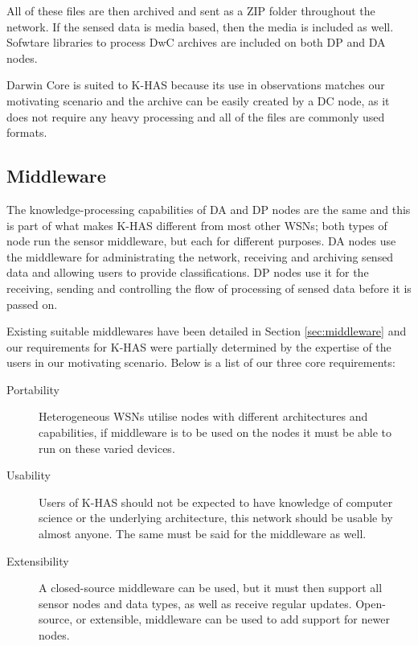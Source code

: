 % 


All of these files are then archived and sent as a ZIP folder throughout the network. If the sensed data is media based, then the media is included as well. Sofwtare libraries to process DwC archives are included on both DP and DA nodes.

Darwin Core is suited to K-HAS because its use in \DIFdelbegin {}\DIFdelend \DIFaddbegin {}\DIFaddend observations matches our motivating scenario and the archive can be easily created by a DC node, as it does not require any heavy processing and all of the files are commonly used formats.

	\subsection{Middleware}
	The knowledge-processing capabilities of DA and DP nodes are the same and this is part of what makes K-HAS different from most other WSNs; both types of node run the sensor middleware, but each for different purposes. DA nodes use the middleware for administrating the network, receiving and archiving sensed data and allowing users to provide classifications. DP nodes use it for the receiving, sending and controlling the flow of processing of sensed data before it is passed on.

	Existing suitable middlewares have been detailed in Section \ref{sec:middleware} and our requirements for K-HAS were partially determined by the expertise of the users in our motivating scenario. Below is a list of our three core requirements:
	\begin{description}
		\item[Portability] Heterogeneous WSNs utilise nodes with different architectures and capabilities, if middleware is to be used on the nodes it must be able to run on these varied devices. 
		\item[Usability] Users of K-HAS should not be expected to have knowledge of computer science or the underlying architecture, this network should be usable by almost anyone. The same must be said for the middleware as well.
		\item[Extensibility] A closed-source middleware can be used, but it must then support all sensor nodes and data types, as well as receive regular updates. Open-source, or extensible, middleware can be used to add support for newer nodes.
	\end{description}

